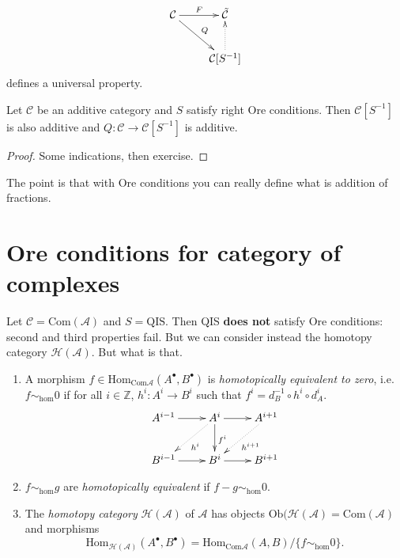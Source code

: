 $$
\xymatrix{
\mathcal{C}\ar[r]^{F}\ar[dr]^{Q}&  \tilde{\mathcal{C}}\\
&\mathcal{C}[S^{-1}]\ar@{.>}[u]
}
$$
defines a universal property.

\begin{proposition}
\label{proposition-Ore-conditions}
Let $\mathcal{C}$ be an additive category and $S$ satisfy right Ore conditions.
Then $\mathcal{C}[S^{-1}]$ is also additive and $Q:\mathcal{C} \to
\mathcal{C}[S^{-1}]$ is additive.
\end{proposition}

\begin{proof}
Some indications, then exercise.
\end{proof}

The point is that with Ore conditions you can really define what is addition of
fractions.

\section{Ore conditions for category of complexes}
\label{subsection-Ore-conditions-for-category-of-complexes}

Let $\mathcal{C}=\text{Com}(\mathcal{A})$ and $S=\text{QIS}$. Then QIS {\bf does
not} satisfy Ore conditions: second and third properties fail. But we can
consider instead the homotopy category $\mathcal{H}(\mathcal{A})$. But what is 
that.

\begin{definition}
\label{definition-homotopy-category}
\begin{enumerate}
\item 
A morphism $f \in \text{Hom}_{\text{Com}\mathcal{A}}(A^{\bullet},B^{\bullet})$
is {\it homotopically equivalent to zero}, i.e. $f \sim_{\text{hom}}0$ if for
all $i\in \mathbb{Z}$, $h^i:A^i \to B^i$ such that 
$f^i=d_B^{-1}\circ h^i \circ d_A^i$.
$$
\xymatrix{
A^{i-1}\ar[r]&
A^{i}\ar[r]\ar@{.>}[dl]^{h^i}\ar[d]^{f^i}&
A^{i+1}\ar@{.>}[dl]^{h^{i+1}}\\
B^{i-1}\ar[r]& B^i\ar[r]& B^{i+1}
}
$$
\item $f\sim_{\text{hom}}g$ are {\it homotopically equivalent} if $f-g
\sim_{\text{hom}}0$.
\item The {\it homotopy category}  $\mathcal{H}(\mathcal{A})$ of $\mathcal{A}$
has objects $\text{Ob}(\mathcal{H}(\mathcal{A})=\text{Com}(\mathcal{A})$ and
morphisms
$$
\text{Hom}_{\mathcal{H}(\mathcal{A})}(A^{\bullet},B^{\bullet})
=\text{Hom}_{\text{Com}\mathcal{A}}(A,B )\Big/\{f\sim_{\text{hom}}0\}.
$$
\end{enumerate}
\end{definition}

